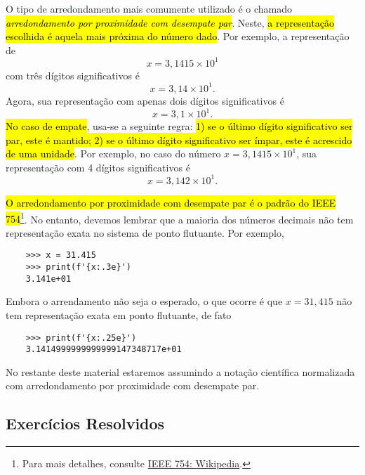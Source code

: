 O tipo de arredondamento mais comumente utilizado é o chamado \hl{\emph{arredondamento por proximidade com desempate par}}. Neste, \hl{a representação escolhida é aquela mais próxima do número dado}. Por exemplo, a representação de 
\begin{equation}
  x=3,1415\times 10^1
\end{equation}
com três dígitos significativos é 
\begin{equation}
  x=3,14\times 10^{1}. 
\end{equation}
Agora, sua representação com apenas dois dígitos significativos é
\begin{equation}
  x=3,1\times 10^{1}.
\end{equation}
\hl{No caso de empate}, usa-se a seguinte regra: \hl{1) se o último dígito significativo ser par, este é mantido; 2) se o último dígito significativo ser ímpar, este é acrescido de uma unidade}. Por exemplo, no caso do número $x=3,1415\times 10^1$, sua representação com 4 dígitos significativos é
\begin{equation}
  x = 3,142\times 10^1.
\end{equation}

\begin{obs}\label{obs:arredondamento_ieee754}
  \hl{O arredondamento por proximidade com desempate par é o padrão do IEEE 754}\footnote{Para mais detalhes, consulte \href{https://en.wikipedia.org/wiki/IEEE\_754\#Rounding\_rules}{IEEE 754: Wikipedia}.}. No entanto, devemos lembrar que a maioria dos números decimais não tem representação exata no sistema de ponto flutuante. Por exemplo,
  \begin{lstlisting}
    >>> x = 31.415
    >>> print(f'{x:.3e}')
    3.141e+01
  \end{lstlisting}
  Embora o arrendamento não seja o esperado, o que ocorre é que $x = 31,415$ não tem representação exata em ponto flutuante, de fato
  \begin{lstlisting}
    >>> print(f'{x:.25e}')
    3.1414999999999999147348717e+01
  \end{lstlisting}
\end{obs}

No restante deste material estaremos assumindo a notação científica normalizada com arredondamento por proximidade com desempate par.

\subsection{Exercícios Resolvidos}

